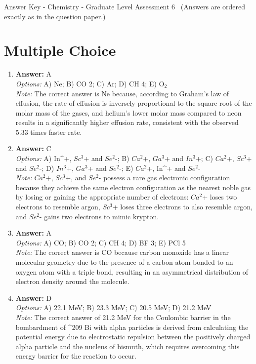 \documentclass[12pt]{article}
\begin{document}
\begin{center}
Answer Key - Chemistry - Graduate Level Assessment 6 \
\small (Answers are ordered exactly as in the question paper.)
\end{center}

\section*{Multiple Choice}
\begin{enumerate}[label=\arabic*.]
\item \textbf{Answer:} A
\\ \textit{Options:} A) Ne; B) CO 2; C) Ar; D) CH 4; E) O$_{2}$
\\ \textit{Note:} The correct answer is Ne because, according to Graham's law of effusion, the rate of effusion is inversely proportional to the square root of the molar mass of the gases, and helium's lower molar mass compared to neon results in a significantly higher effusion rate, consistent with the observed 5.33 times faster rate.
\item \textbf{Answer:} C
\\ \textit{Options:} A) In^+, $Sc^3$+ and $Se^2$-; B) $Ca^2$+, $Ga^3$+ and $In^3$+; C) $Ca^2$+, $Sc^3$+ and $Se^2$-; D) $In^3$+, $Ga^3$+ and $Se^2$-; E) $Ca^2$+, In^+ and $Se^2$-
\\ \textit{Note:} $Ca^2$+, $Sc^3$+, and $Se^2$- possess a rare gas electronic configuration because they achieve the same electron configuration as the nearest noble gas by losing or gaining the appropriate number of electrons: $Ca^2$+ loses two electrons to resemble argon, $Sc^3$+ loses three electrons to also resemble argon, and $Se^2$- gains two electrons to mimic krypton.
\item \textbf{Answer:} A
\\ \textit{Options:} A) CO; B) CO 2; C) CH 4; D) BF 3; E) PCl 5
\\ \textit{Note:} The correct answer is CO because carbon monoxide has a linear molecular geometry due to the presence of a carbon atom bonded to an oxygen atom with a triple bond, resulting in an asymmetrical distribution of electron density around the molecule.
\item \textbf{Answer:} D
\\ \textit{Options:} A) 22.1 MeV; B) 23.3 MeV; C) 20.5 MeV; D) 21.2 MeV
\\ \textit{Note:} The correct answer of 21.2 MeV for the Coulombic barrier in the bombardment of ^209 Bi with alpha particles is derived from calculating the potential energy due to electrostatic repulsion between the positively charged alpha particle and the nucleus of bismuth, which requires overcoming this energy barrier for the reaction to occur.

\end{enumerate}
\end{document}
